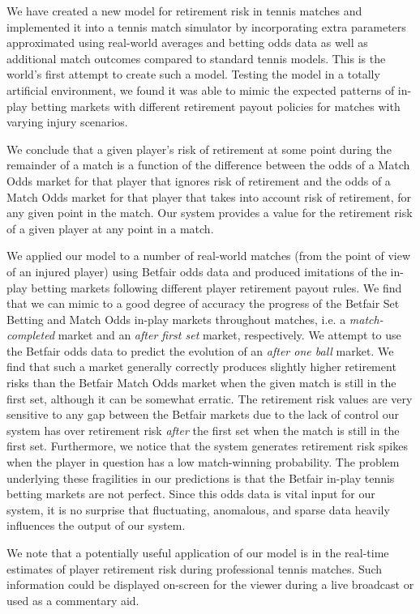 \documentclass[letterpaper,12pt]{article}
\begin{document}
We have created a new model for retirement risk in tennis matches and implemented it into a tennis match simulator by incorporating extra parameters approximated using real-world averages and betting odds data as well as additional match outcomes compared to standard tennis models.  This is the world's first attempt to create such a model.  Testing the model in a totally artificial environment, we found it was able to mimic the expected patterns of in-play betting markets with different retirement payout policies for matches with varying injury scenarios.

We conclude that a given player's risk of retirement at some point during the remainder of a match is a function of the difference between the odds of a Match Odds market for that player that ignores risk of retirement and the odds of a Match Odds market for that player that takes into account risk of retirement, for any given point in the match.  Our system provides a value for the retirement risk of a given player at any point in a match.

We applied our model to a number of real-world matches (from the point of view of an injured player) using Betfair odds data and produced imitations of the in-play betting markets following different player retirement payout rules.  We find that we can mimic to a good degree of accuracy the progress of the Betfair Set Betting and Match Odds in-play markets throughout matches, i.e. a \textit{match-completed} market and an \textit{after first set} market, respectively.  We attempt to use the Betfair odds data to predict the evolution of an \textit{after one ball} market.  We find that such a market generally correctly produces slightly higher retirement risks than the Betfair Match Odds market when the given match is still in the first set, although it can be somewhat erratic.  The retirement risk values are very sensitive to any gap between the Betfair markets due to the lack of control our system has over retirement risk \textit{after} the first set when the match is still in the first set.  Furthermore, we notice that the system generates retirement risk spikes when the player in question has a low match-winning probability.  The problem underlying these fragilities in our predictions is that the Betfair in-play tennis betting markets are not perfect.  Since this odds data is vital input for our system, it is no surprise that fluctuating, anomalous, and sparse data heavily influences the output of our system.

We note that a potentially useful application of our model is in the real-time estimates of player retirement risk during professional tennis matches.  Such information could be displayed on-screen for the viewer during a live broadcast or used as a commentary aid.



\end{document}
